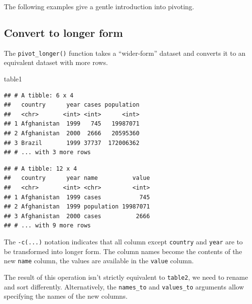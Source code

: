 \documentclass[]{book}
\newenvironment{Shaded}{}{}
\newcommand{\KeywordTok}[1]{\textcolor[rgb]{0.00,0.00,1.00}{#1}}
\newcommand{\NormalTok}[1]{#1}
\newcommand{\OperatorTok}[1]{#1}
\newcommand{\StringTok}[1]{\textcolor[rgb]{0.00,0.50,0.50}{#1}}
\begin{document}
The following examples give a gentle introduction into pivoting.

\hypertarget{convert-to-longer-form}{%
\subsection{Convert to longer form}\label{convert-to-longer-form}}

The \texttt{pivot\_longer()} function takes a ``wider-form'' dataset and converts it to an equivalent dataset with more rows.

\begin{Shaded}
\begin{Highlighting}[]
\NormalTok{table1}
\end{Highlighting}
\end{Shaded}

\begin{verbatim}
## # A tibble: 6 x 4
##   country      year cases population
##   <chr>       <int> <int>      <int>
## 1 Afghanistan  1999   745   19987071
## 2 Afghanistan  2000  2666   20595360
## 3 Brazil       1999 37737  172006362
## # ... with 3 more rows
\end{verbatim}

\begin{Shaded}
\end{Shaded}

\begin{verbatim}
## # A tibble: 12 x 4
##   country      year name          value
##   <chr>       <int> <chr>         <int>
## 1 Afghanistan  1999 cases           745
## 2 Afghanistan  1999 population 19987071
## 3 Afghanistan  2000 cases          2666
## # ... with 9 more rows
\end{verbatim}

The \texttt{-c(...)} notation indicates that all column except \texttt{country} and \texttt{year} are to be transformed into longer form.
The column names become the contents of the new \texttt{name} column, the values are available in the \texttt{value} column.

The result of this operation isn't strictly equivalent to \texttt{table2}, we need to rename and sort differently.
Alternatively, the \texttt{names\_to} and \texttt{values\_to} arguments allow specifying the names of the new columns.
\end{document}
